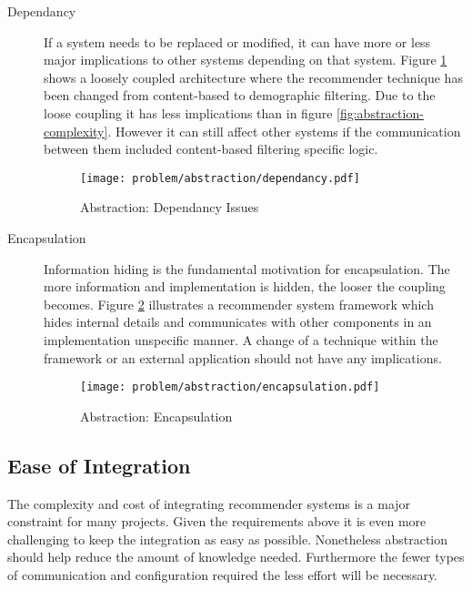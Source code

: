 \begin{description}
    \item[Dependancy] If a system needs to be replaced or modified, it can have more or less major implications to other systems depending on that system. Figure \ref{fig:abstraction-dependancy} shows a loosely coupled architecture where the recommender technique has been changed from content-based to demographic filtering. Due to the loose coupling it has less implications than in figure \ref{fig:abstraction-complexity}. However it can still affect other systems if the communication between them included content-based filtering specific logic.

    \begin{figure}[H]
        \texttt{[image: problem/abstraction/dependancy.pdf]}
        \caption{Abstraction: Dependancy Issues}
        \label{fig:abstraction-dependancy}
    \end{figure}

    \item[Encapsulation] Information hiding is the fundamental motivation for encapsulation. The more information and implementation is hidden, the looser the coupling becomes. Figure \ref{fig:abstraction-encapsulation} illustrates a recommender system framework which hides internal details and communicates with other components in an implementation unspecific manner. A change of a technique within the framework or an external application should not have any implications.

    \begin{figure}[H]
        \texttt{[image: problem/abstraction/encapsulation.pdf]}
        \caption{Abstraction: Encapsulation}
        \label{fig:abstraction-encapsulation}
    \end{figure}
\end{description}

\subsection{Ease of Integration}

The complexity and cost of integrating recommender systems is a major constraint for many projects. Given the requirements above it is even more challenging to keep the integration as easy as possible. Nonetheless abstraction should help reduce the amount of knowledge needed. Furthermore the fewer types of communication and configuration required the less effort will be necessary.